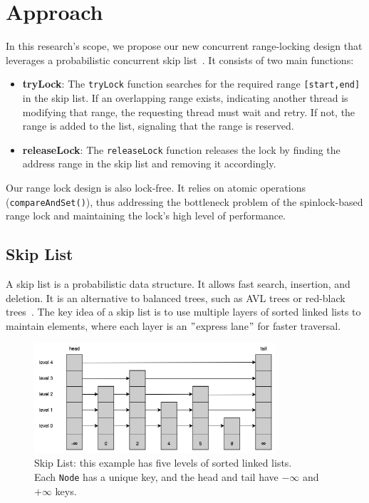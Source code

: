 \chapter{Approach}\label{ch:approach}

In this research's scope, we propose our new concurrent range-locking design that leverages a probabilistic concurrent skip list~\parencite{herlihy2006provably, herlihy2020art}.
It consists of two main functions:
\begin{itemize}
    \item \textbf{tryLock}: The \texttt{tryLock} function searches for the required range \texttt{[start,end]} in the skip list.
    If an overlapping range exists, indicating another thread is modifying that range, the requesting thread must wait and retry.
    If not, the range is added to the list, signaling that the range is reserved.
    \item \textbf{releaseLock}: The \texttt{releaseLock} function releases the lock by finding the address range in the skip list and removing it accordingly.
\end{itemize} 

Our range lock design is also lock-free.
It relies on atomic operations (\texttt{compareAndSet()}), thus addressing the bottleneck problem of the spinlock-based range lock and maintaining the lock's high level of performance.

\section{Skip List}\label{sec:skip-list}

A skip list is a probabilistic data structure.
It allows fast search, insertion, and deletion.
It is an alternative to balanced trees, such as AVL trees or red-black trees~\parencite{pugh1990skip, pugh1990skip2}.
The key idea of a skip list is to use multiple layers of sorted linked lists to maintain elements, where each layer is an \("\)express lane\("\) for faster traversal.

\begin{figure}[h]
    \centering
    \includegraphics[width=0.8\textwidth]{./figures/skiplist}
    \caption{Skip List: this example has five levels of sorted linked lists. \\
 Each \texttt{Node} has a unique key, and the head and tail have $-\infty$ and $+\infty$ keys.}
    \label{fig:skiplist}
\end{figure}

